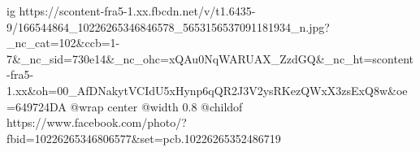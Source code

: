  
 
 
 
 

\ifcmt
  ig https://scontent-fra5-1.xx.fbcdn.net/v/t1.6435-9/166544864_10226265346846578_5653156537091181934_n.jpg?_nc_cat=102&ccb=1-7&_nc_sid=730e14&_nc_ohc=xQAu0NqWARUAX_ZzdGQ&_nc_ht=scontent-fra5-1.xx&oh=00_AfDNakytVCIdU5xHynp6qQR2J3V2ysRKezQWxX3zsExQ8w&oe=649724DA
  @wrap center
  @width 0.8
  @childof https://www.facebook.com/photo/?fbid=10226265346806577&set=pcb.10226265352486719
\fi
